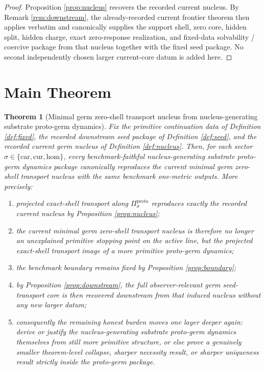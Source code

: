 \documentclass[11pt]{article}
\newcommand{\Car}{\mathrm{car}}
\newcommand{\Cur}{\mathrm{cur}}
\newcommand{\Hom}{\mathrm{hom}}
\newcommand{\ProtoProj}[1]{\Pi_{#1}^{\mathrm{proto}}}
\newtheorem{theorem}{Theorem}
\begin{document}
\begin{proof}
Proposition \ref{prop:nucleus} recovers the recorded current nucleus. By Remark \ref{rem:downstream}, the already-recorded current frontier theorem then applies verbatim and canonically supplies the support shell, zero core, hidden split, hidden charge, exact zero-response realization, and fixed-data solvability / coercive package from that nucleus together with the fixed seed package. No second independently chosen larger current-core datum is added here.
\end{proof}

\section{Main Theorem}

\begin{theorem}[Minimal germ zero-shell transport nucleus from nucleus-generating substrate proto-germ dynamics]
\label{thm:main}
Fix the primitive continuation data of Definition \ref{def:fixed}, the recorded downstream seed package of Definition \ref{def:seed}, and the recorded current germ nucleus of Definition \ref{def:nucleus}. Then, for each sector \(\sigma\in\{\Car,\Cur,\Hom\}\), every benchmark-faithful nucleus-generating substrate proto-germ dynamics package canonically reproduces the current minimal germ zero-shell transport nucleus with the same benchmark one-metric outputs. More precisely:
\begin{enumerate}
    \item projected exact-shell transport along \(\ProtoProj{\sigma}\) reproduces exactly the recorded current nucleus by Proposition \ref{prop:nucleus};
    \item the current minimal germ zero-shell transport nucleus is therefore no longer an unexplained primitive stopping point on the active line, but the projected exact-shell transport image of a more primitive proto-germ dynamics;
    \item the benchmark boundary remains fixed by Proposition \ref{prop:boundary};
    \item by Proposition \ref{prop:downstream}, the full observer-relevant germ seed-transport core is then recovered downstream from that induced nucleus without any new larger datum;
    \item consequently the remaining honest burden moves one layer deeper again: derive or justify the nucleus-generating substrate proto-germ dynamics themselves from still more primitive structure, or else prove a genuinely smaller theorem-level collapse, sharper necessity result, or sharper uniqueness result strictly inside the proto-germ package.
\end{enumerate}
\end{theorem}
\end{document}
